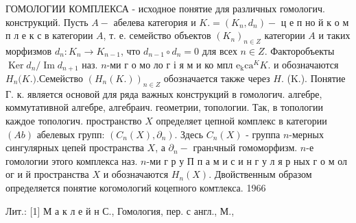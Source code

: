 \documentclass[10pt]{article}
\begin{document}
ГОМОЛОГИИ КОМПЛЕКСА - исходное понятие для различных гомологич. конструкций. Пусть $A-$ абелева категория и $K .=\left(K_{n}, d_{n}\right)-$ ц е п но й к о м п л е к с в категории $A$, т. е. семейство объектов $\left(K_{n}\right)_{n \in Z}$ категории $A$ и таких морфизмов $d_{n}: K_{n} \rightarrow K_{n-1}$, что $d_{n-1} \circ d_{n}=0$ для всех $n \in Z$. Факторобъекты $\operatorname{Ker} d_{n} / \operatorname{Im} d_{n+1}$ наз. $n$-ми г о мо ло г і я м и ко мпл $\mathrm{e}_{\mathrm{k}} \mathrm{c} \mathrm{a}^{K} K$. и обозначаются $H_{n}(K$.$) . Семейство$ $\left(H_{n}(K .)\right)_{n \in Z}$ обозначается также через $H$. (K.). Понятие Г. к. является основой для ряда важных конструкций в гомологич. алгебре, коммутативной алгебре, алгебраич. геометрии, топологии. Так, в топологии каждое топологич. пространство $X$ определяет цепной комплекс в категории $(A b)$ абелевых групп: $\left(C_{n}(X), \partial_{n}\right)$. Здесь $C_{n}(X)$ - группа $n$-мерных сингулярных цепей пространства $X$, а $\partial_{n}-$ гранıчный гомоморфизм. $n$-е гомологии этого комплекса наз. $n$-ми г р у П п а м и с и н г у л я р ных г о м ол ог и й пространства $X$ и обозначаются $H_{n}(X)$. Двойственным образом определяется понятие когомологий коцепного комтлекса. 1966



Лит.: [1] М а к л е й н С., Гомология, пер. с англ., М.,
\end{document}
